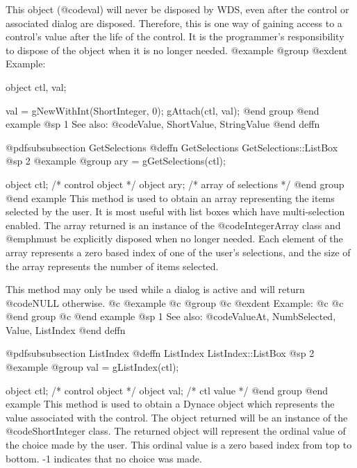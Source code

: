 This object (@code{val}) will never be disposed by WDS, even after
the control or associated dialog are disposed.  Therefore, this
is one way of gaining access to a control's value after the life
of the control.  It is the programmer's responsibility to dispose of
the object when it is no longer needed.
@example
@group
@exdent Example:

object  ctl, val;

val = gNewWithInt(ShortInteger, 0);
gAttach(ctl, val);
@end group
@end example
@sp 1
See also:  @code{Value, ShortValue, StringValue}
@end deffn
















@pdfsubsubsection {GetSelections}
@deffn {GetSelections} GetSelections::ListBox
@sp 2
@example
@group
ary = gGetSelections(ctl);

object  ctl;   /*  control object       */
object  ary;   /*  array of selections  */
@end group
@end example
This method is used to obtain an array representing the items selected
by the user.  It is most useful with list boxes which have multi-selection
enabled.  The array returned is an instance of the @code{IntegerArray} class
and @emph{must} be explicitly disposed when no longer needed.  Each element
of the array represents a zero based index of one of the user's selections,
and the size of the array represents the number of items selected.

This method may only be used while a dialog is active and will return
@code{NULL} otherwise.
@c @example
@c @group
@c @exdent Example:
@c 
@c @end group
@c @end example
@sp 1
See also:  @code{ValueAt, NumbSelected, Value, ListIndex}
@end deffn
















@pdfsubsubsection {ListIndex}
@deffn {ListIndex} ListIndex::ListBox
@sp 2
@example
@group
val = gListIndex(ctl);

object  ctl;   /*  control object  */
object  val;   /*  ctl value       */
@end group
@end example
This method is used to obtain a Dynace object which represents the value
associated with the control.  The object returned will be an instance of
the @code{ShortInteger} class.  The returned object will represent the
ordinal value of the choice made by the user.  This ordinal value is a
zero based index from top to bottom.  -1 indicates that no choice was
made.

